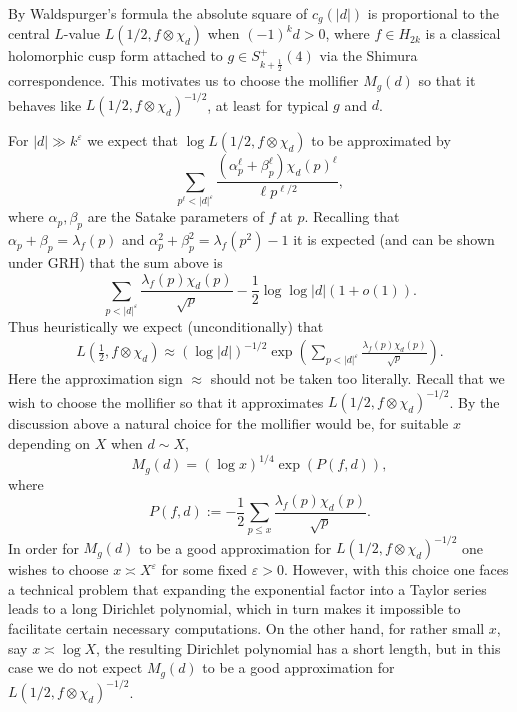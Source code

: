 \documentclass[a4paper,10pt,twoside]{amsart}
\theoremstyle{definition}
\numberwithin{equation}{section}
\newcommand\eps{\varepsilon}
\renewcommand\:{\colon}
\begin{document}
By Waldspurger's formula the absolute square of $c_g(|d|)$ is proportional to the central $L$-value $L(1/2,f\otimes \chi_d)$ when $(-1)^kd>0$, where $f\in H_{2k}$ is a classical holomorphic cusp form attached to $g\in S_{k+\frac 12}^+(4)$ via the Shimura correspondence. This motivates us to choose the mollifier $M_g(d)$ so that it behaves like $L(1/2,f\otimes\chi_d)^{-1/2}$, at least for typical $g$ and $d$.
 
For $|d|\gg k^\eps$ we expect that $\log L(1/2,f\otimes\chi_d)$ to be approximated by
\[ 
\sum_{p^\ell< |d|^\eps}\frac{\left(\alpha_p^\ell+\beta_p^\ell\right)\chi_d(p)^\ell}{\ell p^{\ell/2}},\]
where $\alpha_p,\beta_p$ are the Satake parameters of $f$ at $p$. Recalling that $\alpha_p+\beta_p=\lambda_f(p)$ and $\alpha_p^2+\beta_p^2=\lambda_f(p^2)-1$ it is expected (and can be shown under GRH) that the sum above is
\[ 
\sum_{p<|d|^\eps}\frac{\lambda_f(p)\chi_d(p)}{\sqrt p}-\frac12\log\log|d|\left(1+o(1)\right).\]
Thus heuristically we expect (unconditionally) that
\begin{align}\label{L-function-approximation}
L\left(\frac12,f\otimes\chi_d\right)\approx(\log |d|)^{-1/2}\exp\left(\sum_{p<|d|^\eps}\frac{\lambda_f(p)\chi_d(p)}{\sqrt p}\right).
\end{align} 
Here the approximation sign $\approx$ should not be taken too literally. Recall that we wish to choose the mollifier so that it approximates $L(1/2,f\otimes\chi_d)^{-1/2}$. By the discussion above a natural choice for the mollifier would be, for suitable $x$ depending on $X$ when $d\sim X$,
\[ 
M_g(d)=(\log x)^{1/4}\exp(P(f,d)),\]
where 
\[
P(f,d):=-\frac12\sum_{p\leq x}\frac{\lambda_f(p)\chi_d(p)}{\sqrt p}.
\] 
In order for $M_g(d)$ to be a good approximation for $L(1/2,f\otimes\chi_d)^{-1/2}$ one wishes to choose $x\asymp X^\eps$ for some fixed $\eps>0$. However, with this choice one faces a technical problem that expanding the exponential factor into a Taylor series leads to a long Dirichlet polynomial, which in turn makes it impossible to facilitate certain necessary computations. On the other hand, for rather small $x$, say $x\asymp\log X$, the resulting Dirichlet polynomial has a short length, but in this case we do not expect $M_g(d)$ to be a good approximation for $L(1/2,f\otimes\chi_d)^{-1/2}$.
\end{document}
